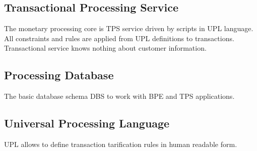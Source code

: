 \subsection{Transactional Processing Service}
The monetary processing core is TPS service driven by scripts in UPL language.
All constraints and rules are applied from UPL definitions to transactions.
Transactional service knows nothing about customer information.

\subsection{Processing Database}
The basic database schema DBS to work with BPE and TPS applications.

\subsection{Universal Processing Language}
UPL allows to define transaction tarification rules in human readable form.
